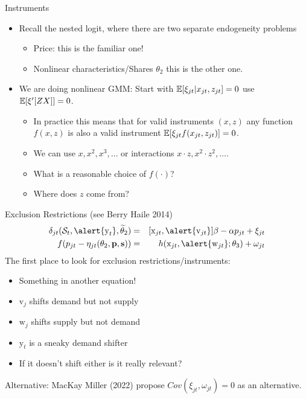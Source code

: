 \begin{frame}{Instruments}
\begin{itemize}
\item Recall the nested logit, where there are two separate endogeneity problems
\begin{itemize}
\item \alert{Price}: this is the familiar one!
\item \alert{Nonlinear characteristics/Shares} $\theta_2$ this is the other one.
\end{itemize}
\item We are doing nonlinear GMM: Start with $\mathbb{E}[\xi_{jt} | x_{jt}, z_{jt}]=0$ use $\mathbb{E}[\xi' [Z X]]=0$.
\begin{itemize}
\item In practice this means that for valid instruments $(x,z)$ any function $f(x,z)$ is also a valid instrument $\mathbb{E}[ \xi_{jt} f(x_{jt},z_{jt})]=0$.
\item We can use $x, x^2, x^3,\ldots$ or interactions $x \cdot z, x^2 \cdot z^2, \ldots$.
\item What is a reasonable choice of $f(\cdot)$?
\item Where does $z$ come from?
\end{itemize}
\end{itemize}
\end{frame}



\begin{frame}{Exclusion Restrictions (see Berry Haile 2014)}
\begin{eqnarray*}
    \delta_{jt}(\mathcal{S}_t,\alert{\textrm{y}_t}, \widetilde{\theta}_2) &=&  [\textrm{x}_{jt}, \alert{\textrm{v}_{jt}}]  \beta  - \alpha p_{jt} + \xi_{jt}\\
    f(p_{jt} - \eta_{jt}(\theta_2,\mathbf{p},\mathbf{s})) &=&   h(\textrm{x}_{jt},\alert{\textrm{w}_{jt}};\theta_3)+\omega_{jt}
\end{eqnarray*}
The first place to look for exclusion restrictions/instruments:
\begin{itemize}
\item Something in another equation!
\item $\textrm{v}_j$ shifts demand but not supply
\item $\textrm{w}_j$ shifts supply but not demand
\item $\textrm{y}_t$ is a sneaky demand shifter
\item If it doesn't shift either is it really relevant?
\end{itemize}
Alternative: MacKay Miller (2022) propose $Cov(\xi_{jt},  \omega_{jt})=0$ as an alternative.
\end{frame}



